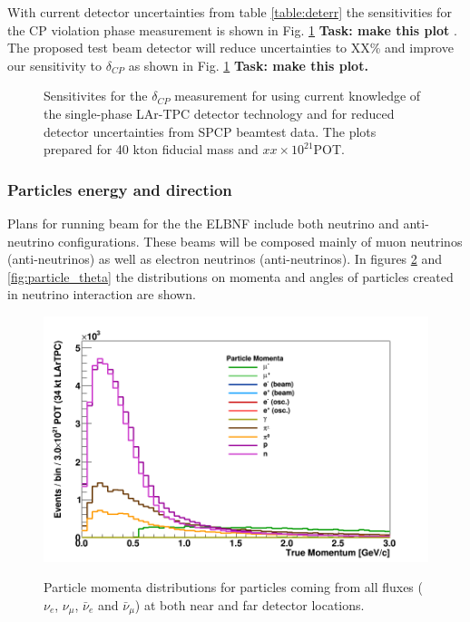 With current detector uncertainties from table \ref{table:deterr} the sensitivities for the CP violation phase measurement is shown in Fig. \ref{fig:cpsensitivity}  {\bf Task: make this plot} . The  proposed test beam detector will reduce uncertainties to XX\%  and improve our sensitivity to $\delta_{CP}$ as shown in Fig. \ref{fig:cpsensitivity} {\bf Task: make this plot.}



\begin{figure}[h!]
  \centering
\label{fig:cpsensitivity}
  \caption{Sensitivites for the $\delta_{CP}$ measurement  for using current knowledge of the single-phase LAr-TPC detector technology and for reduced detector uncertainties from SPCP beamtest data.  The plots prepared for 40 kton fiducial mass and $xx\times 10^{21}$POT.}
\end{figure}

\newpage

\subsubsection{Particles energy and direction}
\label{detbeam_particles}
Plans for running beam for the the ELBNF include both neutrino and anti-neutrino configurations. These beams will be composed  mainly of muon neutrinos (anti-neutrinos) as well as electron neutrinos (anti-neutrinos). In figures \ref{fig:particle_momenta} and \ref{fig:particle_theta} the distributions on momenta and angles of particles created in neutrino interaction are shown. 

\begin{figure}[h!]
  \centering
\includegraphics[scale=0.4]{figures/True_Momenta_per_Particle}
\label{fig:particle_momenta}
  \caption{Particle momenta distributions for particles coming from all fluxes ($\nu_e$, $\nu_\mu$, $\bar \nu_e$ and $\bar \nu_\mu$) at both near and far detector locations.  }
\end{figure}


